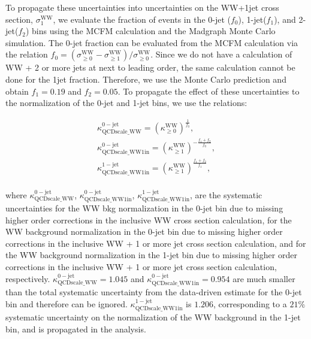 To propagate these uncertainties into uncertainties on the WW+1jet cross section, $\sigma^{\mathrm{WW}}_{1}$,
we evaluate the fraction of events in the 0-jet ($f_{0}$), 1-jet($f_{1}$), and 2-jet($f_{2}$) 
bins using the MCFM calculation and the Madgraph Monte Carlo simulation. The 0-jet fraction can be 
evaluated from the MCFM calculation via the relation 
$f_{0} = (\sigma^{\mathrm{WW}}_{\geq 0} - \sigma^{\mathrm{WW}}_{\geq 1}) / \sigma^{\mathrm{WW}}_{\geq 0}$.
Since we do not have a calculation of WW + 2 or more jets at next to leading order, the same calculation 
cannot be done for the  1jet fraction. Therefore, we use the Monte Carlo prediction and obtain 
$f_{1} = 0.19$ and $f_{2} = 0.05$. To propagate the effect of these uncertainties to the 
normalization of the 0-jet and 1-jet bins, we use the relations:

\begin{eqnarray}
\label{eqn:WWJetBinFractions}
\kappa^{\mathrm{0-jet}}_{\mathrm{QCDscale\_WW}} = (\kappa^{\mathrm{WW}}_{\geq 0})^{\frac{1}{f_{0}}},                 \\
\kappa^{\mathrm{0-jet}}_{\mathrm{QCDscale\_WW1in}} = (\kappa^{\mathrm{WW}}_{\geq 1})^{- \frac{f_{1}+f_{2}}{f_{0}}},  \\
\kappa^{\mathrm{1-jet}}_{\mathrm{QCDscale\_WW1in}} = (\kappa^{\mathrm{WW}}_{\geq 1})^{\frac{f_{1}+f_{2}}{f_{1}}},    \\
\end{eqnarray}

where $\kappa^{\mathrm{0-jet}}_{\mathrm{QCDscale\_WW}}$, $\kappa^{\mathrm{0-jet}}_{\mathrm{QCDscale\_WW1in}}$,
$\kappa^{\mathrm{1-jet}}_{\mathrm{QCDscale\_WW1in}}$, are the systematic uncertainties for the WW bkg normalization in 
the 0-jet bin due to missing higher order corrections in the inclusive WW cross section calculation,
for the WW background normalization in the 0-jet bin due to missing higher order corrections in the inclusive WW + 1 or 
more jet cross section calculation, and for the WW background normalization in the 1-jet bin due to missing higher 
order corrections in the inclusive WW + 1 or more jet cross section calculation, respectively. 
$\kappa^{\mathrm{0-jet}}_{\mathrm{QCDscale\_WW}} = 1.045$ and $\kappa^{\mathrm{0-jet}}_{\mathrm{QCDscale\_WW1in}} = 0.954$
are much smaller than the total systematic uncertainty from the data-driven estimate for the 0-jet bin and
therefore can be ignored. $\kappa^{\mathrm{1-jet}}_{\mathrm{QCDscale\_WW1in}}$ is $1.206$, corresponding to 
a $21\%$ systematic uncertainty on the normalization of the WW background in the 1-jet bin, and is propagated in the
analysis.

